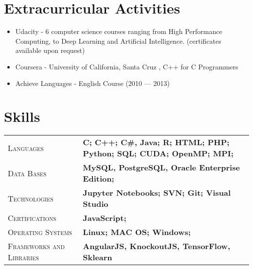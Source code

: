 \documentclass[10pt, a4paper, oneside, final]{scrartcl} %
\newcommand{\gray}{\rowcolor[gray]{.90}} %
\begin{document}
\section{Extracurricular Activities}
\begin{center}
\begin{itemize}\itemsep1.5pt
\item Udacity - 6 computer science courses ranging from High Performance Computing, to Deep Learning and Artificial Intelligence. (certificates available upon request)
\item Coursera - University of California, Santa Cruz , C++ for C Programmers
\item Achieve Languages - English Course (2010 --- 2013)

\end{itemize}
\end{center}


\section{Skills}

\begin{center}
\begin{tabularx}{1.0\linewidth}{>{\raggedleft\scshape}p{3.2cm}X}
\gray Languages & \textbf{C; C++; C\#, Java; R; HTML; PHP; Python; SQL; CUDA; OpenMP; MPI;}\\
\gray Data Bases & \textbf{MySQL, PostgreSQL, Oracle Enterprise Edition;}\\
\gray Technologies & \textbf{Jupyter Notebooks; SVN; Git; Visual Studio}\\
\gray Certifications & \textbf{JavaScript;}\\
\gray Operating Systems & \textbf{Linux; MAC OS; Windows;}\\
\gray Frameworks and Libraries & \textbf{AngularJS, KnockoutJS, TensorFlow, Sklearn}\\
\end{tabularx}
\end{center}
\end{document}
